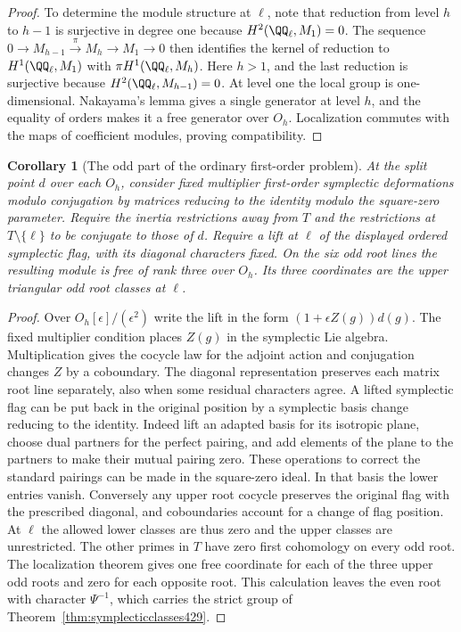 \documentclass[a4paper,11pt]{article}
\newtheorem{corollary}[proposition]{Corollary}
\theoremstyle{definition}
\theoremstyle{remark}
\numberwithin{equation}{section}
\begin{document}
\begin{proof}
To determine the module structure at \(\ell\), note that
reduction from level \(h\) to \(h-1\) is surjective in
degree one because \(H^2(\QQ_\ell,M_1)=0\). The sequence
\(0\to M_{h-1}\xrightarrow{\pi}M_h\to M_1\to0\)
then identifies the kernel of reduction to \(H^1(\QQ_\ell,M_1)\)
with \(\pi H^1(\QQ_\ell,M_h)\). Here \(h>1\), and the last
reduction is surjective because \(H^2(\QQ_\ell,M_{h-1})=0\).
At level one the local group is one-dimensional.
Nakayama's lemma gives a single generator at level \(h\),
and the equality of orders makes it a free generator over
\(O_h\). Localization commutes with the maps of coefficient
modules, proving compatibility.
\end{proof}

\begin{corollary}[The odd part of the ordinary first-order problem]\leavevmode
\label{cor:ordinaryoddroots430}
At the split point \(d\) over each \(O_h\), consider fixed
multiplier first-order symplectic deformations modulo
conjugation by matrices reducing to the identity modulo the
square-zero parameter. Require the inertia restrictions away
from \(T\) and the restrictions at \(T\setminus\{\ell\}\)
to be conjugate to those of \(d\). Require a lift at \(\ell\)
of the displayed ordered symplectic flag, with its diagonal
characters fixed. On the six odd root lines the resulting
module is free of rank three over \(O_h\). Its three
coordinates are the upper triangular odd root classes at
\(\ell\).
\end{corollary}
\begin{proof}
Over \(O_h[\epsilon]/(\epsilon^2)\) write the lift in the
form \((1+\epsilon Z(g))d(g)\). The fixed multiplier condition
places \(Z(g)\) in the symplectic Lie algebra. Multiplication
gives the cocycle law for the adjoint action and conjugation
changes \(Z\) by a coboundary. The diagonal representation
preserves each matrix root line separately, also when some
residual characters agree. A lifted symplectic flag can be
put back in the original position by a symplectic basis change
reducing to the identity. Indeed lift an adapted basis for its
isotropic plane, choose dual partners for the perfect pairing,
and add elements of the plane to the partners to make their
mutual pairing zero. These operations to correct the standard
pairings can be made in the square-zero ideal. In that basis
the lower entries vanish. Conversely any upper root cocycle
preserves the original flag with the prescribed diagonal, and
coboundaries account for a change of flag position.
At \(\ell\) the allowed lower classes are thus zero and the
upper classes are unrestricted. The other primes in \(T\)
have zero first cohomology on every odd root. The localization
theorem gives one free coordinate for each of the three
upper odd roots and zero for each opposite root. This calculation
leaves the even root with character \(\Psi^{-1}\), which
carries the strict group of Theorem~\ref{thm:symplecticclasses429}.
\end{proof}
\end{document}
